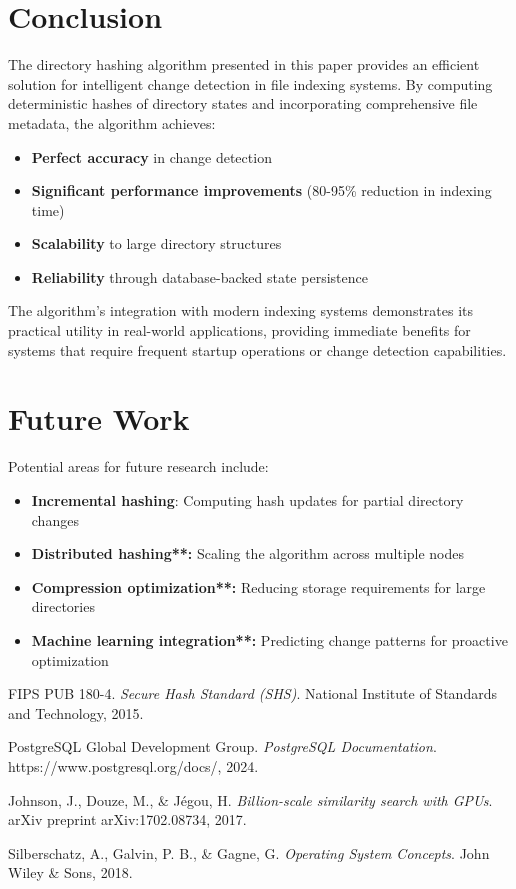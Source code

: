 \documentclass[11pt,a4paper]{article}
\begin{document}
\section{Conclusion}

The directory hashing algorithm presented in this paper provides an efficient solution for intelligent change detection in file indexing systems. By computing deterministic hashes of directory states and incorporating comprehensive file metadata, the algorithm achieves:

\begin{itemize}
    \item \textbf{Perfect accuracy} in change detection
    \item \textbf{Significant performance improvements} (80-95\% reduction in indexing time)
    \item \textbf{Scalability} to large directory structures
    \item \textbf{Reliability} through database-backed state persistence
\end{itemize}

The algorithm's integration with modern indexing systems demonstrates its practical utility in real-world applications, providing immediate benefits for systems that require frequent startup operations or change detection capabilities.

\section{Future Work}

Potential areas for future research include:

\begin{itemize}
    \item \textbf{Incremental hashing}: Computing hash updates for partial directory changes
    \item \textbf{Distributed hashing**:} Scaling the algorithm across multiple nodes
    \item \textbf{Compression optimization**:} Reducing storage requirements for large directories
    \item \textbf{Machine learning integration**:} Predicting change patterns for proactive optimization
\end{itemize}


\begin{thebibliography}{9}

FIPS PUB 180-4.
\textit{Secure Hash Standard (SHS)}.
National Institute of Standards and Technology, 2015.

PostgreSQL Global Development Group.
\textit{PostgreSQL Documentation}.
https://www.postgresql.org/docs/, 2024.

Johnson, J., Douze, M., \& Jégou, H.
\textit{Billion-scale similarity search with GPUs}.
arXiv preprint arXiv:1702.08734, 2017.

Silberschatz, A., Galvin, P. B., \& Gagne, G.
\textit{Operating System Concepts}.
John Wiley \& Sons, 2018.

\end{thebibliography}
\end{document}
